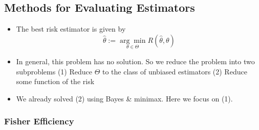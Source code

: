 \documentclass{article}
\begin{document}
\subsection{Methods for Evaluating Estimators}
\begin{itemize}
\item The best risk estimator is given by $$\hat{\theta} := \underset{\theta\in\Theta}{\arg\min}R(\hat{\theta},\theta)$$
\item In general, this problem has no solution. So we reduce the problem into two subproblems (1) Reduce $\Theta$ to the class of unbiased estimators (2) Reduce some function of the risk
\item We already solved (2) using Bayes \& minimax. Here we focus on (1). 
\end{itemize}
\subsubsection{Fisher Efficiency}
\end{document}
